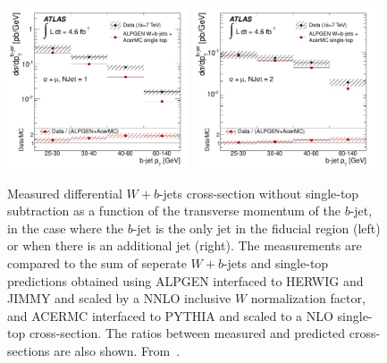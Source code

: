 \documentclass[11pt]{cernrep}
\begin{document}
\begin{figure}
\begin{center}
\includegraphics[width=0.48\textwidth]{fig_09a.pdf}
\includegraphics[width=0.48\textwidth]{fig_09b.pdf}
\caption{\label{fig:wb}
Measured differential $W+b$-jets cross-section without single-top subtraction as a function of the transverse momentum of the $b$-jet, in the 
case where the $b$-jet is the only jet in the fiducial region (left) or when there is an additional jet (right). 
The measurements are compared to the sum of seperate $W+b$-jets and single-top predictions 
obtained using ALPGEN interfaced to HERWIG and JIMMY and scaled by a NNLO inclusive $W$ normalization factor, and ACERMC interfaced to PYTHIA and scaled to a 
NLO single-top cross-section. 
The ratios between measured and predicted cross-sections are also shown. From~\protect\cite{Aad:2013vka}.}
\end{center}
\end{figure}
\end{document}
